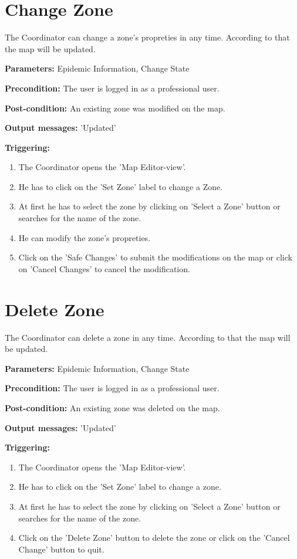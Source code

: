 \section{Change Zone}
\label{operation:ChangeZone}
The Coordinator can change a zone's propreties in any time. According
to that the map will be updated.\\
\begin{description}
\item \textbf{Parameters:} Epidemic Information, Change State
\item \textbf{Precondition:} The user is logged in as a professional user.
\item \textbf{Post-condition:} An existing zone was modified on the map.
\item \textbf{Output messages:} 'Updated'
\item \textbf{Triggering:}
\begin{enumerate}
\item The Coordinator opens the 'Map Editor-view'.
\item He has to click on the 'Set Zone' label to change a Zone.
\item At first he has to select the zone by clicking on 'Select a Zone' button
or searches for the name of the zone.
\item He can modify the zone's propreties.
\item Click on the 'Safe Changes' to submit the modifications
on the map or click on 'Cancel Changes' to cancel the modification.
\end{enumerate}
\end{description} 

\section{Delete Zone}
\label{operation:DeleteZone}
The Coordinator can delete a zone in any time. According
to that the map will be updated.\\
\begin{description}
\item \textbf{Parameters:} Epidemic Information, Change State
\item \textbf{Precondition:} The user is logged in as a professional user.
\item \textbf{Post-condition:} An existing zone was deleted on the map.
\item \textbf{Output messages:} 'Updated'
\item \textbf{Triggering:}
\begin{enumerate}
\item The Coordinator opens the 'Map Editor-view'.
\item He has to click on the 'Set Zone' label to change a zone.
\item At first he has to select the zone by clicking on 'Select a Zone' button
or searches for the name of the zone.
\item Click on the 'Delete Zone' button to delete the zone or click on the
'Cancel Change' button to quit.
\end{enumerate}
\end{description} 

